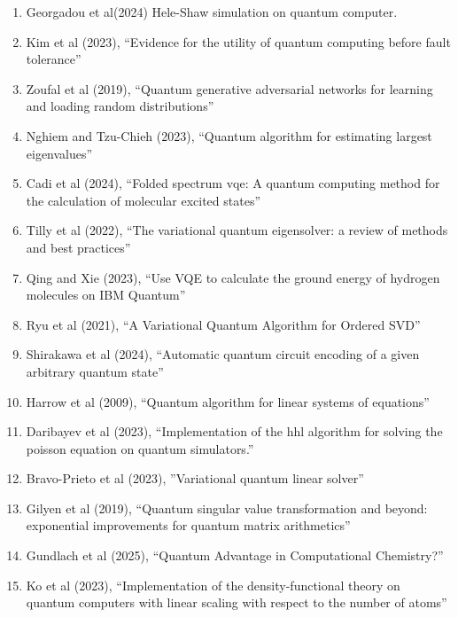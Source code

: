 \documentclass[]{article}
\begin{document}
\begin{enumerate}
  ``HamLib: A Library of Hamiltonians for Benchmarking Quantum Algorithms and Hardware''
\item Georgadou et al(2024)\cite{gopalakrishnan2024solving}
	Hele-Shaw simulation on quantum computer.
\item Kim et al (2023)\cite{kim2023evidence}, ``Evidence for the utility of quantum computing before fault tolerance''
\item Zoufal et al (2019)\cite{zoufal2019quantum}, ``Quantum generative adversarial networks for learning and loading random distributions''
\item Nghiem and Tzu-Chieh (2023)\cite{nghiem2023quantum}, ``Quantum algorithm for estimating largest eigenvalues''
\item Cadi et al (2024)\cite{cadi2024folded}, ``Folded spectrum vqe: A quantum computing method for the calculation of molecular excited states''
\item Tilly et al (2022)\cite{tilly2022variational}, ``The variational quantum eigensolver: a review of methods and best practices''
\item Qing and Xie (2023)\cite{qing2023usevqecalculateground}, ``Use VQE to calculate the ground energy of hydrogen molecules on IBM Quantum''
\item Ryu et al (2021)\cite{VQSVD}, ``A Variational Quantum Algorithm for Ordered SVD''
\item Shirakawa et al (2024)\cite{PhysRevResearch.6.043008}, ``Automatic quantum circuit encoding of a given arbitrary quantum state''
\item Harrow et al (2009)\cite{harrow2009quantum}, ``Quantum algorithm for linear systems of equations''
\item Daribayev et al (2023)\cite{daribayev2023implementation}, 
  ``Implementation of the hhl algorithm for solving the poisson equation on quantum simulators.''
\item Bravo-Prieto et al (2023)\cite{bravo2023variational},
  ''Variational quantum linear solver''
\item Gilyen et al (2019)\cite{gilyen2019quantum},
  ``Quantum singular value transformation and beyond: exponential improvements for quantum matrix arithmetics''
\item Gundlach et al (2025)\cite{gundlach2025quantumadvantagecomputationalchemistry}, ``Quantum Advantage in Computational Chemistry?''
\item Ko et al (2023)\cite{ko2023implementation}, ``Implementation of the density-functional theory on quantum computers with linear scaling with respect to the number of atoms''

\end{enumerate}
\end{document}
